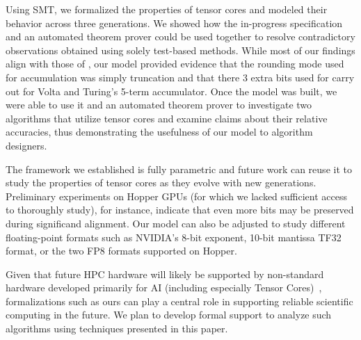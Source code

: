 Using SMT, we formalized the properties of tensor cores and modeled their behavior across three generations.
We showed how the in-progress specification and an automated theorem prover could be used together to resolve contradictory observations obtained using solely test-based methods.
While most of our findings align with those of \citet{fasi2021numerical}, our model provided evidence that the rounding mode used for accumulation was simply truncation and that there 3 extra bits used for carry out for Volta and Turing's 5-term accumulator.
Once the model was built, we were able to use it and an automated theorem prover to investigate two algorithms that utilize tensor cores and examine claims about their relative accuracies, thus demonstrating the usefulness of our model to algorithm designers.

The framework we established is fully parametric and future work can reuse it to study the properties of tensor cores as they evolve with new generations. Preliminary experiments on Hopper GPUs (for which we lacked sufficient access to thoroughly study), for instance, indicate that even more bits may be preserved during significand alignment. Our model can also be adjusted to study different floating-point formats such as NVIDIA's 8-bit exponent, 10-bit mantissa TF32 format, or the two FP8 formats supported on Hopper. 

Given that future HPC hardware will likely be supported by non-standard hardware developed primarily for AI (including especially Tensor Cores)~\cite{reed2023hpc}, formalizations such as ours can play a central role in supporting reliable scientific computing in the future.
We plan to develop formal support to analyze such algorithms using techniques presented in this paper.
